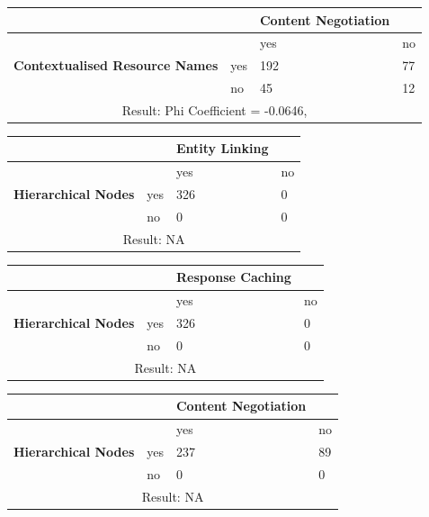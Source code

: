 \documentclass[a4paper,12pt]{article}
\begin{document}
\begin{center}
  \begin{tabular}{| p{60mm} | p{10mm} | p{35mm} | p{35mm} |}
  \hline
   & & \textbf{Content Negotiation} &
  \\
  \hline
  & & yes & no
  \\
  \hline
  \textbf{Contextualised Resource Names} & yes & 192 & 77
  \\
  \hline
   & no & 45 & 12
  \\
  \hline
  \multicolumn{4}{|c|}{Result: Phi Coefficient = -0.0646, }
  \\ \hline
  \end{tabular}
  \end{center}

\begin{center}
  \begin{tabular}{| p{60mm} | p{10mm} | p{35mm} | p{35mm} |}
  \hline
   & & \textbf{Entity Linking} &
  \\
  \hline
  & & yes & no
  \\
  \hline
  \textbf{Hierarchical Nodes} & yes & 326 & 0
  \\
  \hline
   & no & 0 & 0
  \\
  \hline
  \multicolumn{4}{|c|}{Result: NA}
  \\ \hline
  \end{tabular}
  \end{center}

\begin{center}
  \begin{tabular}{| p{60mm} | p{10mm} | p{35mm} | p{35mm} |}
  \hline
   & & \textbf{Response Caching} &
  \\
  \hline
  & & yes & no
  \\
  \hline
  \textbf{Hierarchical Nodes} & yes & 326 & 0
  \\
  \hline
   & no & 0 & 0
  \\
  \hline
  \multicolumn{4}{|c|}{Result: NA}
  \\ \hline
  \end{tabular}
  \end{center}

\begin{center}
  \begin{tabular}{| p{60mm} | p{10mm} | p{35mm} | p{35mm} |}
  \hline
   & & \textbf{Content Negotiation} &
  \\
  \hline
  & & yes & no
  \\
  \hline
  \textbf{Hierarchical Nodes} & yes & 237 & 89
  \\
  \hline
   & no & 0 & 0
  \\
  \hline
  \multicolumn{4}{|c|}{Result: NA}
  \\ \hline
  \end{tabular}
  \end{center}
\end{document}
